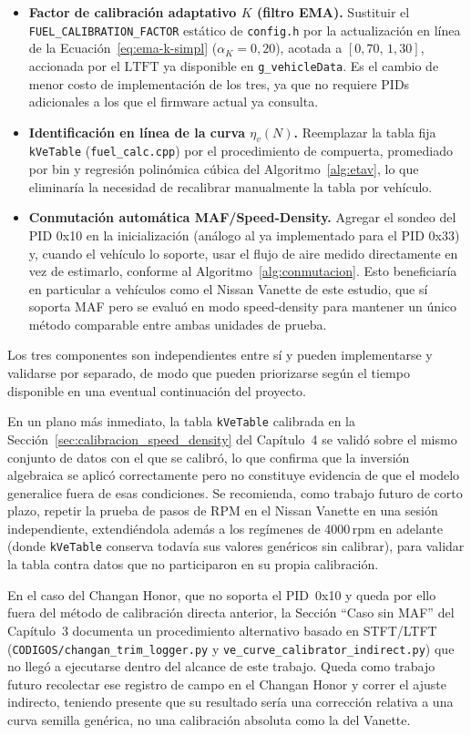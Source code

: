 \begin{itemize}
	\item \textbf{Factor de calibración adaptativo $K$ (filtro EMA).} Sustituir
	el \texttt{FUEL\_CALIBRATION\_FACTOR} estático de \texttt{config.h} por la
	actualización en línea de la Ecuación~\eqref{eq:ema-k-simpl}
	($\alpha_K=0{,}20$), acotada a $[0{,}70,\,1{,}30]$, accionada por el
	$\mathrm{LTFT}$ ya disponible en \texttt{g\_vehicleData}. Es el cambio de
	menor costo de implementación de los tres, ya que no requiere PIDs
	adicionales a los que el firmware actual ya consulta.
	\item \textbf{Identificación en línea de la curva $\eta_v(N)$.} Reemplazar
	la tabla fija \texttt{kVeTable} (\texttt{fuel\_calc.cpp}) por el
	procedimiento de compuerta, promediado por bin y regresión polinómica
	cúbica del Algoritmo~\ref{alg:etav}, lo que eliminaría la necesidad de
	recalibrar manualmente la tabla por vehículo.
	\item \textbf{Conmutación automática MAF/Speed-Density.} Agregar el sondeo
	del PID 0x10 en la inicialización (análogo al ya implementado para el PID
	0x33) y, cuando el vehículo lo soporte, usar el flujo de aire medido
	directamente en vez de estimarlo, conforme al Algoritmo~\ref{alg:conmutacion}.
	Esto beneficiaría en particular a vehículos como el Nissan Vanette de este
	estudio, que sí soporta MAF pero se evaluó en modo speed-density para
	mantener un único método comparable entre ambas unidades de prueba.
\end{itemize}

Los tres componentes son independientes entre sí y pueden implementarse y
validarse por separado, de modo que pueden priorizarse según el tiempo
disponible en una eventual continuación del proyecto.

En un plano más inmediato, la tabla \texttt{kVeTable} calibrada en la
Sección~\ref{sec:calibracion_speed_density} del Capítulo~4 se validó sobre
el mismo conjunto de datos con el que se calibró, lo que confirma que la
inversión algebraica se aplicó correctamente pero no constituye evidencia
de que el modelo generalice fuera de esas condiciones. Se recomienda, como
trabajo futuro de corto plazo, repetir la prueba de pasos de RPM en el
Nissan Vanette en una sesión independiente, extendiéndola además a los
regímenes de 4000\,rpm en adelante (donde \texttt{kVeTable} conserva
todavía sus valores genéricos sin calibrar), para validar la tabla contra
datos que no participaron en su propia calibración.

En el caso del Changan Honor, que no soporta el PID~0x10 y queda por ello
fuera del método de calibración directa anterior, la Sección
``Caso sin MAF'' del Capítulo~3 documenta un procedimiento alternativo basado
en STFT/LTFT (\texttt{CODIGOS/changan\_trim\_logger.py} y
\texttt{ve\_curve\_calibrator\_indirect.py}) que no llegó a ejecutarse
dentro del alcance de este trabajo. Queda como trabajo futuro recolectar
ese registro de campo en el Changan Honor y correr el ajuste indirecto,
teniendo presente que su resultado sería una corrección relativa a una
curva semilla genérica, no una calibración absoluta como la del Vanette.

